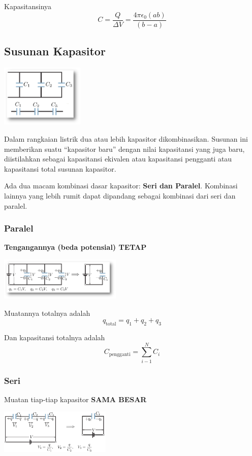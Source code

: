 \documentclass[twocolumn, 11pt]{article}%
\begin{document}
    Kapasitansinya
    \[C=\frac{Q}{\Delta V}=\frac{4\pi\epsilon_0(ab)}{(b-a)} \]

    \subsection{Susunan Kapasitor}%
    \begin{center}
        \includegraphics[width=150px]{8.png}
    \end{center}
    Dalam rangkaian listrik dua atau lebih kapasitor dikombinasikan. Susunan ini memberikan suatu “kapasitor baru” dengan nilai kapasitansi yang juga baru, diistilahkan sebagai kapasitansi ekivalen atau kapasitansi pengganti atau kapasitansi total susunan kapasitor.

    Ada dua macam kombinasi dasar kapasitor: \textbf{Seri dan Paralel}.
    Kombinasi lainnya yang lebih rumit dapat dipandang sebagai kombinasi dari seri dan paralel.

    \subsubsection{Paralel}%
    \textbf{Tengangannya (beda potensial) TETAP}
    \begin{center}
        \includegraphics[width=220px]{9.png}
    \end{center}
    Muatannya totalnya adalah
    \[q_{\text{total}}=q_1+q_2+q_3 \]

    Dan kapasitansi totalnya adalah
    \[C_{\text{pengganti}}=\sum^N_{i-1} C_i \]

    \subsubsection{Seri}%
    Muatan tiap-tiap kapasitor \textbf{SAMA BESAR} 
    \begin{center}
        \includegraphics[width=200px]{10.png}
    \end{center}
\end{document}
